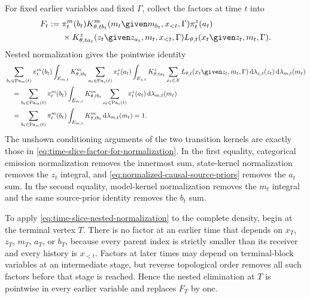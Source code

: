 For fixed earlier variables and fixed $\Gamma$, collect the factors at time $t$ into
\begin{equation}
\begin{aligned}
F_t
:={}&\pi_t^m(b_t)
K^m_{\theta,tb_t}(m_t\given m_{b_t},x_{<t},\Gamma)
\pi_t^z(a_t)\\
&\times K^z_{\theta,ta_t}(z_t\given z_{a_t},m_t,x_{<t},\Gamma)
L_{\theta,t}(x_t\given z_t,m_t,\Gamma).
\end{aligned}
\label{eq:time-slice-factor-for-normalization}
\end{equation}
Nested normalization gives the pointwise identity
\begin{equation}
\begin{aligned}
&\sum_{b_t\in\operatorname{Pa}_m(t)}\pi_t^m(b_t)
\int_{E_{m,t}}K^m_{\theta,tb_t}
\sum_{a_t\in\operatorname{Pa}_z(t)}\pi_t^z(a_t)
\int_{E_{z,t}}K^z_{\theta,ta_t}
\sum_{x_t\in\mathcal X}L_{\theta,t}(x_t\given z_t,m_t,\Gamma)
\mathop{\mathrm d\lambda_{z,t}(z_t)}
\mathop{\mathrm d\lambda_{m,t}(m_t)}\\
&\quad=
\sum_{b_t\in\operatorname{Pa}_m(t)}\pi_t^m(b_t)
\int_{E_{m,t}}K^m_{\theta,tb_t}
\sum_{a_t\in\operatorname{Pa}_z(t)}\pi_t^z(a_t)
\mathop{\mathrm d\lambda_{m,t}(m_t)}\\
&\quad=
\sum_{b_t\in\operatorname{Pa}_m(t)}\pi_t^m(b_t)
\int_{E_{m,t}}K^m_{\theta,tb_t}
\mathop{\mathrm d\lambda_{m,t}(m_t)}
=1.
\end{aligned}
\label{eq:time-slice-nested-normalization}
\end{equation}
The unshown conditioning arguments of the two transition kernels are exactly those in \cref{eq:time-slice-factor-for-normalization}.  In the first equality, categorical emission normalization removes the innermost sum, state-kernel normalization removes the $z_t$ integral, and \cref{eq:normalized-causal-source-priors} removes the $a_t$ sum.  In the second equality, model-kernel normalization removes the $m_t$ integral and the same source-prior identity removes the $b_t$ sum.

To apply \cref{eq:time-slice-nested-normalization} to the complete density, begin at the terminal vertex $T$.  There is no factor at an earlier time that depends on $x_T$, $z_T$, $m_T$, $a_T$, or $b_T$, because every parent index is strictly smaller than its receiver and every history is $x_{<t}$.  Factors at later times may depend on terminal-block variables at an intermediate stage, but reverse topological order removes all such factors before that stage is reached.  Hence the nested elimination at $T$ is pointwise in every earlier variable and replaces $F_T$ by one.

